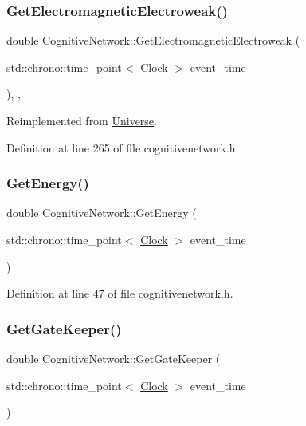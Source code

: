 \subsubsection{\texorpdfstring{Get\+Electromagnetic\+Electroweak()}{GetElectromagneticElectroweak()}}
{\footnotesize\ttfamily double Cognitive\+Network\+::\+Get\+Electromagnetic\+Electroweak (\begin{DoxyParamCaption}\item[{std\+::chrono\+::time\+\_\+point$<$ \mbox{\hyperlink{universe_8h_a0ef8d951d1ca5ab3cfaf7ab4c7a6fd80}{Clock}} $>$}]{event\+\_\+time }\end{DoxyParamCaption})\hspace{0.3cm}{\ttfamily [inline]}, {\ttfamily [final]}, {\ttfamily [virtual]}}



Reimplemented from \mbox{\hyperlink{class_universe_a9f099605c082e7fa755787a6a8cab7ba}{Universe}}.



Definition at line 265 of file cognitivenetwork.\+h.

\mbox{\label{class_cognitive_network_af23b9bce2587ccf3c8204be33fc76c61}} 
\subsubsection{\texorpdfstring{Get\+Energy()}{GetEnergy()}}
{\footnotesize\ttfamily double Cognitive\+Network\+::\+Get\+Energy (\begin{DoxyParamCaption}\item[{std\+::chrono\+::time\+\_\+point$<$ \mbox{\hyperlink{universe_8h_a0ef8d951d1ca5ab3cfaf7ab4c7a6fd80}{Clock}} $>$}]{event\+\_\+time }\end{DoxyParamCaption})\hspace{0.3cm}{\ttfamily [inline]}}



Definition at line 47 of file cognitivenetwork.\+h.

\mbox{\label{class_cognitive_network_a3a9be1c6697d063b0836cdcdc7a2600c}} 
\subsubsection{\texorpdfstring{Get\+Gate\+Keeper()}{GetGateKeeper()}}
{\footnotesize\ttfamily double Cognitive\+Network\+::\+Get\+Gate\+Keeper (\begin{DoxyParamCaption}\item[{std\+::chrono\+::time\+\_\+point$<$ \mbox{\hyperlink{universe_8h_a0ef8d951d1ca5ab3cfaf7ab4c7a6fd80}{Clock}} $>$}]{event\+\_\+time }\end{DoxyParamCaption})\hspace{0.3cm}{\ttfamily [inline]}}



